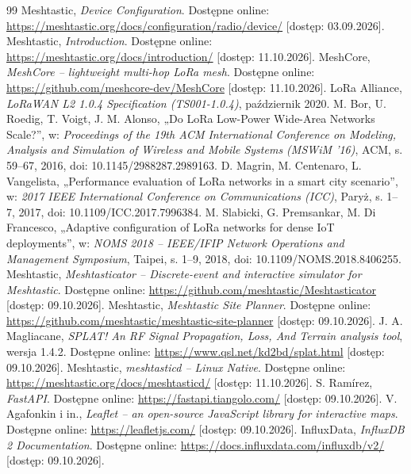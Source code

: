 \documentclass[12pt,a4paper,twoside]{report}
\theoremstyle{definition} %
\begin{document}
\begin{thebibliography}{99}
     Meshtastic, \emph{Device Configuration}. Dostępne online: \url{https://meshtastic.org/docs/configuration/radio/device/} [dostęp: 03.09.2026].
     Meshtastic, \emph{Introduction}. Dostępne online: \url{https://meshtastic.org/docs/introduction/} [dostęp: 11.10.2026].
     MeshCore, \emph{MeshCore -- lightweight multi-hop LoRa mesh}. Dostępne online: \url{https://github.com/meshcore-dev/MeshCore} [dostęp: 11.10.2026].
     LoRa Alliance, \emph{LoRaWAN L2 1.0.4 Specification (TS001-1.0.4)}, październik 2020.
     M. Bor, U. Roedig, T. Voigt, J. M. Alonso, „Do LoRa Low-Power Wide-Area Networks Scale?”, w: \emph{Proceedings of the 19th ACM International Conference on Modeling, Analysis and Simulation of Wireless and Mobile Systems (MSWiM '16)}, ACM, s. 59--67, 2016, doi: 10.1145/2988287.2989163.
     D. Magrin, M. Centenaro, L. Vangelista, „Performance evaluation of LoRa networks in a smart city scenario”, w: \emph{2017 IEEE International Conference on Communications (ICC)}, Paryż, s. 1--7, 2017, doi: 10.1109/ICC.2017.7996384.
     M. Slabicki, G. Premsankar, M. Di Francesco, „Adaptive configuration of LoRa networks for dense IoT deployments”, w: \emph{NOMS 2018 -- IEEE/IFIP Network Operations and Management Symposium}, Taipei, s. 1--9, 2018, doi: 10.1109/NOMS.2018.8406255.
     Meshtastic, \emph{Meshtasticator -- Discrete-event and interactive simulator for Meshtastic}. Dostępne online: \url{https://github.com/meshtastic/Meshtasticator} [dostęp: 09.10.2026].
     Meshtastic, \emph{Meshtastic Site Planner}. Dostępne online: \url{https://github.com/meshtastic/meshtastic-site-planner} [dostęp: 09.10.2026].
     J. A. Magliacane, \emph{SPLAT! An RF Signal Propagation, Loss, And Terrain analysis tool}, wersja 1.4.2. Dostępne online: \url{https://www.qsl.net/kd2bd/splat.html} [dostęp: 09.10.2026].
     Meshtastic, \emph{meshtasticd -- Linux Native}. Dostępne online: \url{https://meshtastic.org/docs/meshtasticd/} [dostęp: 11.10.2026].
     S. Ramírez, \emph{FastAPI}. Dostępne online: \url{https://fastapi.tiangolo.com/} [dostęp: 09.10.2026].
     V. Agafonkin i in., \emph{Leaflet -- an open-source JavaScript library for interactive maps}. Dostępne online: \url{https://leafletjs.com/} [dostęp: 09.10.2026].
     InfluxData, \emph{InfluxDB 2 Documentation}. Dostępne online: \url{https://docs.influxdata.com/influxdb/v2/} [dostęp: 09.10.2026].

\end{thebibliography}
\end{document}
